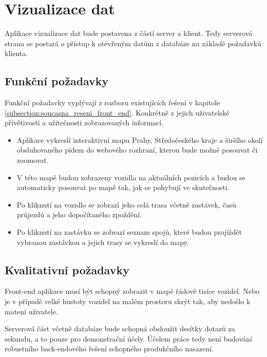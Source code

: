 \section{Vizualizace dat} \label{section:navrh_vizualizace}


 Aplikace vizualizace dat bude postavena z částí server a klient. Tedy serverová strana se postará o přístup k otevřeným datům z databáze na základě požadavků klienta.


\subsection{Funkční požadavky}


Funkční požadavky vyplývají z rozboru existujících řešení v kapitole \ref{subsection:soucasna_reseni_front_end}. Konkrétně z jejich uživatelské přívětivosti a užitečnosti zobrazovaných informací.


\begin{itemize}


\item Aplikace vykreslí interaktivní mapu Prahy, Středočeského kraje a širšího okolí obsluhovaného \gls{pid}em do webového rozhraní, kterou bude možné posouvat či zoomovat.


\item V této mapě budou zobrazeny vozidla na aktuálních pozicích a budou se automaticky posouvat po mapě tak, jak se pohybují ve skutečnosti.


\item Po kliknutí na vozidlo se zobrazí jeho celá trasa včetně zastávek, časů průjezdů a jeho dopočítaného zpoždění.


\item Po kliknutí na zastávku se zobrazí seznam spojů, které budou projíždět vybranou zastávkou a jejich trasy se vykreslí do mapy.


\end{itemize}


\subsection{Kvalitativní požadavky}


Front-end aplikace musí být schopný zobrazit v mapě řádově tisíce vozidel. Nebo je v případě velké hustoty vozidel na malém prostoru skrýt tak, aby nedošlo k matení uživatele.


\bigbreak


Serverová část včetně databáze bude schopná obsloužit desítky dotazů za sekundu, a to pouze pro demonstrační účely. Účelem práce tedy není budování robustního back-endového řešení schopného produkčního nasazení.


